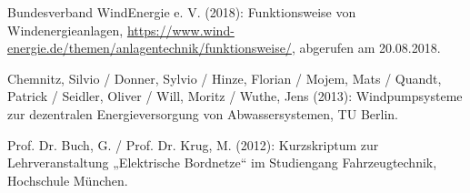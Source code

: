 
\begin{thebibliography}{999}

Bundesverband WindEnergie e. V.  (2018): Funktionsweise von Windenergieanlagen,\newline
\url{https://www.wind-energie.de/themen/anlagentechnik/funktionsweise/},\newline 
abgerufen am 20.08.2018.

Chemnitz, Silvio / Donner, Sylvio / Hinze, Florian / Mojem, Mats / Quandt, Patrick / Seidler, Oliver / Will, Moritz / Wuthe, Jens  (2013): Windpumpsysteme zur dezentralen Energieversorgung von Abwassersystemen, TU Berlin.

Prof. Dr. Buch, G. / Prof. Dr. Krug, M.  (2012): Kurzskriptum zur Lehrveranstaltung „Elektrische Bordnetze“ im Studiengang Fahrzeugtechnik, Hochschule München.

\end{thebibliography}
